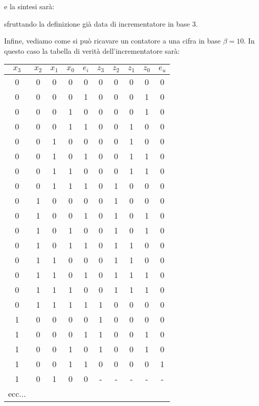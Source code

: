 \documentclass[a4paper,11pt]{article}
\begin{document}
e la sintesi sarà:

sfruttando la definizione già data di incrementatore in base 3.

Infine, vediamo come si può ricavare un contatore a una cifra in base $\beta = 10$.
In questo caso la tabella di verità dell'incrementatore sarà:

\begin{table}[H]
	\center 
	\begin{tabular} { c c  c  c  c | c  c  c  c  c }
		$x_3$ & $x_2$ & $x_1$ & $x_0$ & $e_i$ & $z_3$ & $z_2$ & $z_1$ & $z_0$ & $e_u$ \\ 
		\hline
		0 & 0 & 0 & 0 & 0 & 0 & 0 & 0 & 0 & 0 \\
		0 & 0 & 0 & 0 & 1 & 0 & 0 & 0 & 1 & 0 \\
		0 & 0 & 0 & 1 & 0 & 0 & 0 & 0 & 1 & 0 \\
		0 & 0 & 0 & 1 & 1 & 0 & 0 & 1 & 0 & 0 \\
		0 & 0 & 1 & 0 & 0 & 0 & 0 & 1 & 0 & 0 \\
		0 & 0 & 1 & 0 & 1 & 0 & 0 & 1 & 1 & 0 \\
		0 & 0 & 1 & 1 & 0 & 0 & 0 & 1 & 1 & 0 \\
		0 & 0 & 1 & 1 & 1 & 0 & 1 & 0 & 0 & 0 \\
		0 & 1 & 0 & 0 & 0 & 0 & 1 & 0 & 0 & 0 \\
		0 & 1 & 0 & 0 & 1 & 0 & 1 & 0 & 1 & 0 \\
		0 & 1 & 0 & 1 & 0 & 0 & 1 & 0 & 1 & 0 \\
		0 & 1 & 0 & 1 & 1 & 0 & 1 & 1 & 0 & 0 \\
		0 & 1 & 1 & 0 & 0 & 0 & 1 & 1 & 0 & 0 \\
		0 & 1 & 1 & 0 & 1 & 0 & 1 & 1 & 1 & 0 \\
		0 & 1 & 1 & 1 & 0 & 0 & 1 & 1 & 1 & 0 \\
		0 & 1 & 1 & 1 & 1 & 1 & 0 & 0 & 0 & 0 \\
		1 & 0 & 0 & 0 & 0 & 1 & 0 & 0 & 0 & 0 \\
		1 & 0 & 0 & 0 & 1 & 1 & 0 & 0 & 1 & 0 \\
		1 & 0 & 0 & 1 & 0 & 1 & 0 & 0 & 1 & 0 \\
		1 & 0 & 0 & 1 & 1 & 0 & 0 & 0 & 0 & 1 \\
		1 & 0 & 1 & 0 & 0 & - & - & - & - & - \\
		ecc...
	\end{tabular}
\end{table}
\end{document}
